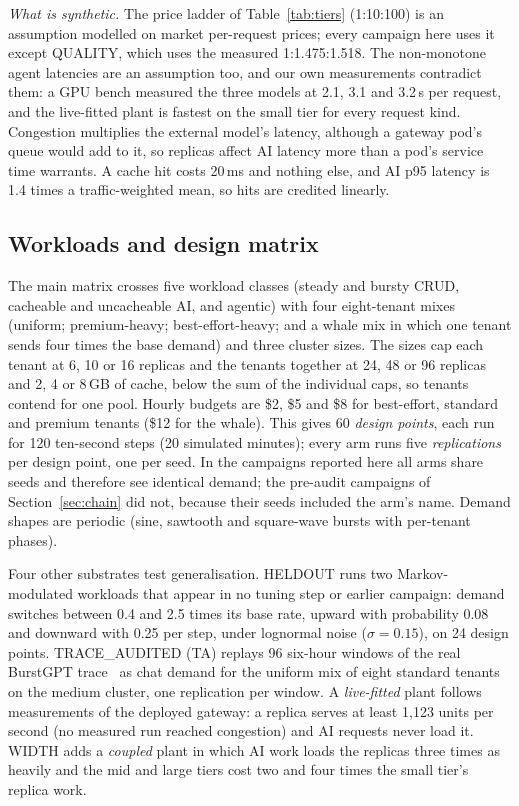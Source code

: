\emph{What is synthetic.} The price ladder of Table~\ref{tab:tiers}
(1:10:100) is an assumption modelled on market per-request prices; every
campaign here uses it except QUALITY, which uses the measured 1:1.475:1.518.
The non-monotone agent latencies are an assumption too, and our own
measurements contradict them: a GPU bench measured the three models at
2.1, 3.1 and 3.2\,s per request, and the live-fitted plant is fastest on the
small tier for every request kind. Congestion multiplies the external
model's latency, although a gateway pod's queue would add to it, so
replicas affect AI latency more than a pod's service time warrants. A cache
hit costs 20\,ms and nothing else, and AI p95 latency is 1.4 times a
traffic-weighted mean, so hits are credited linearly.

\subsection{Workloads and design matrix}
\label{sec:workloads}

The main matrix crosses five workload classes (steady and bursty CRUD,
cacheable and uncacheable AI, and agentic) with four eight-tenant mixes
(uniform; premium-heavy; best-effort-heavy; and a whale mix in which one
tenant sends four times the base demand) and three cluster sizes. The sizes cap each
tenant at 6, 10 or 16 replicas and the tenants together at 24, 48 or 96
replicas and 2, 4 or 8\,GB of cache, below the sum of the individual caps,
so tenants contend for one pool. Hourly budgets are \$2, \$5 and \$8 for
best-effort, standard and premium tenants (\$12 for the whale). This gives 60 \emph{design points}, each run for 120
ten-second steps (20 simulated minutes); every arm runs five
\emph{replications} per design point, one per seed. In the campaigns
reported here all arms share seeds and therefore see identical demand; the
pre-audit campaigns of Section~\ref{sec:chain} did not, because their seeds
included the arm's name. Demand shapes are periodic (sine, sawtooth and
square-wave bursts with per-tenant phases).

Four other substrates test generalisation. HELDOUT runs two
Markov-modulated workloads that appear in no tuning step or earlier
campaign: demand switches between 0.4 and 2.5 times its base rate, upward
with probability 0.08 and downward with 0.25 per step, under lognormal
noise ($\sigma=0.15$), on 24 design points. TRACE\_AUDITED (TA) replays 96
six-hour windows of the real BurstGPT trace~\cite{burstgpt} as chat demand
for the uniform mix of eight standard tenants on the medium cluster, one
replication per window. A \emph{live-fitted} plant
follows measurements of the deployed gateway: a replica serves at least
1{,}123 units per second (no measured run reached congestion) and AI
requests never load it. WIDTH adds a \emph{coupled} plant in which AI work
loads the replicas three times as heavily and the mid and large tiers cost
two and four times the small tier's replica work.

